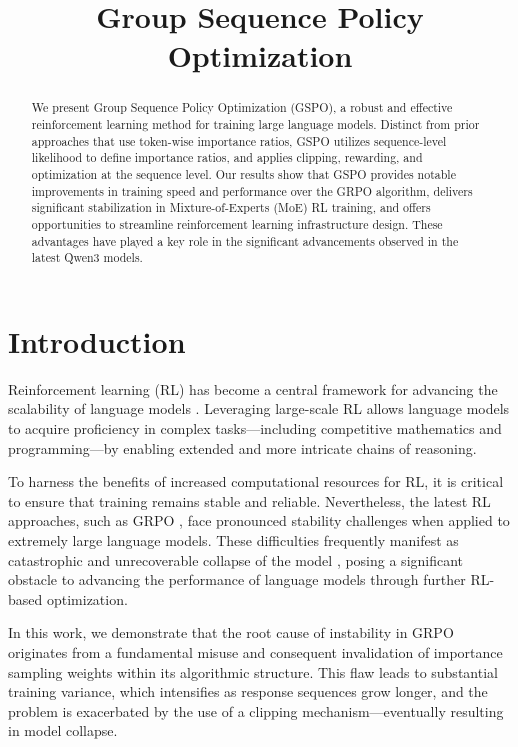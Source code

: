 \title{Group Sequence Policy Optimization}

\begin{abstract}
We present Group Sequence Policy Optimization (GSPO), a robust and effective reinforcement learning method for training large language models. Distinct from prior approaches that use token-wise importance ratios, GSPO utilizes sequence-level likelihood to define importance ratios, and applies clipping, rewarding, and optimization at the sequence level. Our results show that GSPO provides notable improvements in training speed and performance over the GRPO algorithm, delivers significant stabilization in Mixture-of-Experts (MoE) RL training, and offers opportunities to streamline reinforcement learning infrastructure design. These advantages have played a key role in the significant advancements observed in the latest Qwen3 models.
\end{abstract}

\section{Introduction}
\label{sec:intro}

Reinforcement learning (RL) has become a central framework for advancing the scalability of language models \citep{o1,dpsk-r1,qwq32b,qwen3}. Leveraging large-scale RL allows language models to acquire proficiency in complex tasks—including competitive mathematics and programming—by enabling extended and more intricate chains of reasoning.

To harness the benefits of increased computational resources for RL, it is critical to ensure that training remains stable and reliable. Nevertheless, the latest RL approaches, such as GRPO \citep{grpo}, face pronounced stability challenges when applied to extremely large language models. These difficulties frequently manifest as catastrophic and unrecoverable collapse of the model \citep{qwen3, minimax-m1}, posing a significant obstacle to advancing the performance of language models through further RL-based optimization.

In this work, we demonstrate that the root cause of instability in GRPO originates from a fundamental misuse and consequent invalidation of importance sampling weights within its algorithmic structure. This flaw leads to substantial training variance, which intensifies as response sequences grow longer, and the problem is exacerbated by the use of a clipping mechanism—eventually resulting in model collapse.

